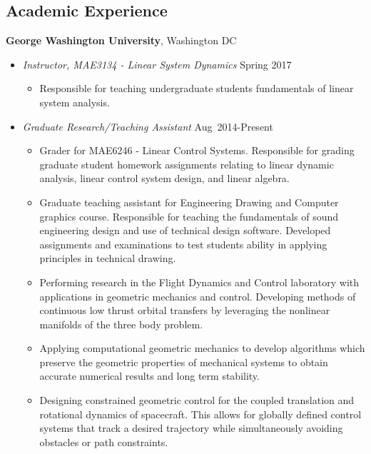 \subsection*{Academic Experience}
{}

\textbf{George Washington University}, Washington DC
    \begin{itemize}
        \item[] \textit{Instructor, MAE3134 - Linear System Dynamics} \hfill {Spring 2017}
        \begin{itemize}
            \item Responsible for teaching undergraduate students fundamentals of linear system analysis. 
        \end{itemize}
        \item[] \textit{Graduate Research/Teaching Assistant} \hfill {Aug~2014-Present}
        \begin{itemize}
            \item Grader for MAE6246 - Linear Control Systems. 
            Responsible for grading graduate student homework assignments relating to linear dynamic analysis, linear control system design, and linear algebra. 
            \item Graduate teaching assistant for Engineering Drawing and Computer graphics course.
            Responsible for teaching the fundamentals of sound engineering design and use of technical design software.
            Developed assignments and examinations to test students ability in applying principles in technical drawing.
            \item Performing research in the Flight Dynamics and Control laboratory with applications in geometric mechanics and control. 
            Developing methods of continuous low thrust orbital transfers by leveraging the nonlinear manifolds of the three body problem.
            \item Applying computational geometric mechanics to develop algorithms which preserve the geometric properties of mechanical systems to obtain accurate numerical results and long term stability.
            \item Designing constrained geometric control for the coupled translation and rotational dynamics of spacecraft.
            This allows for globally defined control systems that track a desired trajectory while simultaneously avoiding obstacles or path constraints.
        \end{itemize}

\end{itemize}
